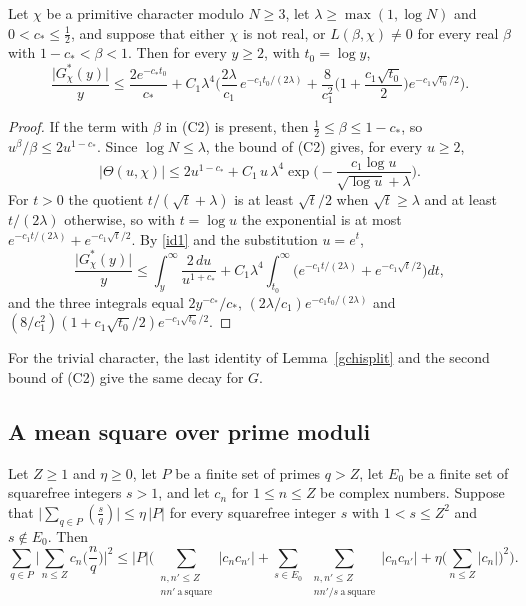 \begin{proposition}\label{thinprop}
Let $\chi$ be a primitive character modulo $N\ge3$, let $\lambda\ge\max(1,\log N)$ and $0<c_\ast\le\frac12$, and suppose that either $\chi$ is not real, or $L(\beta,\chi)\ne0$ for every real $\beta$ with $1-c_\ast<\beta<1$. Then for every $y\ge2$, with $t_0=\log y$,
\[
\frac{\lvert G^\ast_\chi(y)\rvert}{y}\le\frac{2e^{-c_\ast t_0}}{c_\ast}+C_1\lambda^4\Big(\frac{2\lambda}{c_1}\,e^{-c_1t_0/(2\lambda)}+\frac8{c_1^2}\Big(1+\frac{c_1\sqrt{t_0}}2\Big)e^{-c_1\sqrt{t_0}/2}\Big).
\]
\end{proposition}

\begin{proof}
If the term with $\beta$ in (C2) is present, then $\frac12\le\beta\le1-c_\ast$, so $u^\beta/\beta\le2u^{1-c_\ast}$. Since $\log N\le\lambda$, the bound of (C2) gives, for every $u\ge2$,
\[
\lvert\Theta(u,\chi)\rvert\le2u^{1-c_\ast}+C_1\,u\,\lambda^4\exp\Big(-\frac{c_1\log u}{\sqrt{\log u}+\lambda}\Big).
\]
For $t>0$ the quotient $t/(\sqrt t+\lambda)$ is at least $\sqrt t/2$ when $\sqrt t\ge\lambda$ and at least $t/(2\lambda)$ otherwise, so with $t=\log u$ the exponential is at most $e^{-c_1t/(2\lambda)}+e^{-c_1\sqrt t/2}$. By \eqref{id1} and the substitution $u=e^t$,
\[
\frac{\lvert G^\ast_\chi(y)\rvert}y\le\int_y^\infty\frac{2\,du}{u^{1+c_\ast}}+C_1\lambda^4\int_{t_0}^\infty\Big(e^{-c_1t/(2\lambda)}+e^{-c_1\sqrt t/2}\Big)dt ,
\]
and the three integrals equal $2y^{-c_\ast}/c_\ast$, $(2\lambda/c_1)e^{-c_1t_0/(2\lambda)}$ and $(8/c_1^2)(1+c_1\sqrt{t_0}/2)e^{-c_1\sqrt{t_0}/2}$.
\end{proof}

For the trivial character, the last identity of Lemma~\ref{gchisplit} and the second bound of (C2) give the same decay for $G$.

\subsection{A mean square over prime moduli}

\begin{proposition}\label{meansq}
Let $Z\ge1$ and $\eta\ge0$, let $P$ be a finite set of primes $q>Z$, let $E_0$ be a finite set of squarefree integers $s>1$, and let $c_n$ for $1\le n\le Z$ be complex numbers. Suppose that $\lvert\sum_{q\in P}(\frac sq)\rvert\le\eta\,\lvert P\rvert$ for every squarefree integer $s$ with $1<s\le Z^2$ and $s\notin E_0$. Then
\[
\sum_{q\in P}\Big\lvert\sum_{n\le Z}c_n\Big(\frac nq\Big)\Big\rvert^2\le\lvert P\rvert\Big(\sum_{\substack{n,n'\le Z\\ nn'\ \mathrm{a\ square}}}\lvert c_nc_{n'}\rvert+\sum_{s\in E_0}\ \sum_{\substack{n,n'\le Z\\ nn'/s\ \mathrm{a\ square}}}\lvert c_nc_{n'}\rvert+\eta\Big(\sum_{n\le Z}\lvert c_n\rvert\Big)^2\Big).
\]
\end{proposition}

